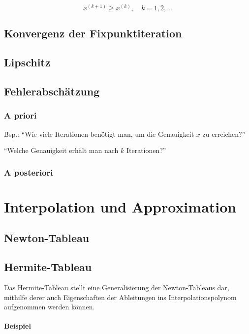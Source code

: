 \documentclass[a4paper, twoside]{article}
\begin{document}
\[x^{(k+1)} \geq x^{(k)},\quad k = 1, 2, \ldots\]

\subsection{Konvergenz der Fixpunktiteration}

\subsection{Lipschitz}

\subsection{Fehlerabschätzung}

\subsubsection{A priori}

Bsp.: \enquote{Wie viele Iterationen benötigt man, um die Genauigkeit \(x\) zu erreichen?}

\enquote{Welche Genauigkeit erhält man nach \(k\) Iterationen?}

\subsubsection{A posteriori}

\section{Interpolation und Approximation}

\subsection{Newton-Tableau}

\clearpage

\subsection{Hermite-Tableau}

Das Hermite-Tableau stellt eine Generalisierung der Newton-Tableaus dar, mithilfe derer auch Eigenschaften der Ableitungen ins Interpolationspolynom aufgenommen werden können.

\paragraph{Beispiel}
\end{document}
